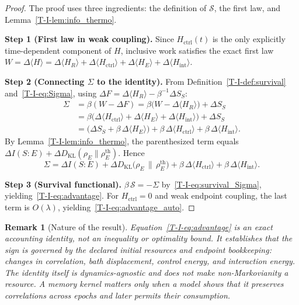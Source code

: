 \documentclass[12pt,a4paper,openany]{book}
\newtheorem{remark}[theorem]{Remark}
\begin{document}
\begin{proof}
The proof uses three ingredients: the definition of
$\mathcal{S}$, the first law, and
Lemma~\ref{T-I-lem:info_thermo}.

\noindent\textbf{Step 1 (First law in weak coupling).}
Since $H_{\mathrm{ctrl}}(t)$ is the only explicitly time-dependent
component of $H$, inclusive work satisfies the exact first law
$W = \Delta\langle H \rangle
= \Delta\langle H_R \rangle
  + \Delta\langle H_{\mathrm{ctrl}} \rangle
  + \Delta\langle H_E \rangle
  + \Delta\langle H_{\mathrm{int}} \rangle$.

\noindent\textbf{Step 2 (Connecting $\Sigma$ to the
identity).}
From Definition~\ref{T-I-def:survival} and~\eqref{T-I-eq:Sigma},
using $\Delta F = \Delta\langle H_R \rangle
- \beta^{-1}\Delta S_S$:
\begin{align}
\Sigma &= \beta(W - \Delta F)
= \beta\bigl(W - \Delta\langle H_R \rangle\bigr)
  + \Delta S_S \nonumber \\
&= \beta\bigl(\Delta\langle H_{\mathrm{ctrl}} \rangle
  + \Delta\langle H_E \rangle
  + \Delta\langle H_{\mathrm{int}} \rangle\bigr) + \Delta S_S
\nonumber \\
&= \bigl(\Delta S_S
  + \beta\,\Delta\langle H_E \rangle\bigr)
  + \beta\,\Delta\langle H_{\mathrm{ctrl}} \rangle
  + \beta\,\Delta\langle H_{\mathrm{int}} \rangle.
\label{T-I-eq:Sigma_decomp}
\end{align}
By Lemma~\ref{T-I-lem:info_thermo}, the parenthesized term
equals
$\Delta I(S{:}E)
+ \Delta D_{\mathrm{KL}}(\rho_E \| \rho_E^{\mathrm{th}})$.
Hence
\begin{equation}
\label{T-I-eq:Sigma_general}
\Sigma = \Delta I(S{:}E)
  + \Delta D_{\mathrm{KL}}\!\bigl(\rho_E \,\big\|\,
    \rho_E^{\mathrm{th}}\bigr)
  + \beta\,\Delta\langle H_{\mathrm{ctrl}} \rangle
  + \beta\,\Delta\langle H_{\mathrm{int}} \rangle.
\end{equation}

\noindent\textbf{Step 3 (Survival functional).}
$\beta\,\mathcal{S} = -\Sigma$ by~\eqref{T-I-eq:survival_Sigma},
yielding~\eqref{T-I-eq:advantage}.
For $H_{\mathrm{ctrl}} = 0$ and weak endpoint coupling, the last
term is $O(\lambda)$, yielding~\eqref{T-I-eq:advantage_auto}.
\end{proof}

\begin{remark}[Nature of the result]
\label{T-I-rem:identity_not_bound}
Equation~\eqref{T-I-eq:advantage} is an exact
\emph{accounting identity}, not an inequality or
optimality bound.
It establishes that the sign is governed by the declared initial
resources and endpoint bookkeeping: changes in correlation, bath
displacement, control energy, and interaction energy.  The identity
itself is dynamics-agnostic and does not make non-Markovianity a
resource.  A memory kernel matters only when a model shows that it
preserves correlations across epochs and later permits their
consumption.
\end{remark}
\end{document}
